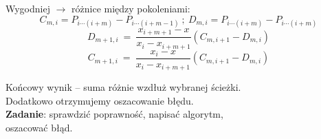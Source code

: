 \begin{frame}


Wygodniej $\rightarrow$ różnice między pokoleniami:
$$
C_{m,i}=P_{i\cdots(i+m)}-P_{i\cdots(i+m-1)}\ ;\ D_{m,i}=P_{i\cdots(i+m)}-P_{i\cdots(i+m)}
$$
$$
D_{m+1,i}\ =\ \frac{x_{i+m+1}-x}{x_{i}-x_{i+m+1}}(C_{m,i+1}-D_{m,i})
$$
$$
C_{m+1,i}\ =\ \frac{x_{i}-x}{x_{i}-x_{i+m+1}}(C_{m,i+1}-D_{m,i})
$$
\vspace{3mm}

Końcowy wynik -- suma różnie wzdłuż wybranej ścieżki. \\
Dodatkowo otrzymujemy oszacowanie błędu. \\
\vspace{3mm}
\textbf{Zadanie}: sprawdzić poprawność, napisać algorytm, \\
oszacować błąd.
\end{frame}